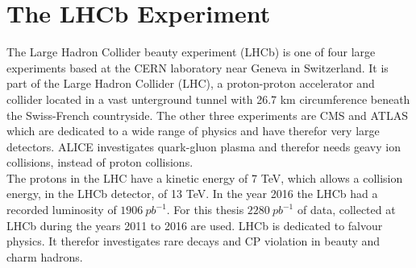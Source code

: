 \documentclass[english]{uzhpub}
\begin{document}


\section{The LHCb Experiment}
The Large Hadron Collider beauty experiment (LHCb) is one of four large experiments based at the CERN laboratory near Geneva in Switzerland. It is part of the Large Hadron Collider (LHC), a proton-proton accelerator and collider located in a vast unterground tunnel with 26.7 km circumference beneath the Swiss-French countryside.
The other three experiments are CMS and ATLAS which are dedicated to a wide range of physics and have therefor very large detectors. ALICE investigates quark-gluon plasma and therefor needs geavy ion collisions, instead of proton collisions. \\
The protons in the LHC have a kinetic energy of 7 TeV, which allows a collision energy, in the LHCb detector, of 13 TeV. In the year 2016 the LHCb had a recorded luminosity of $\SI{1906}{pb^{-1}}$. For this thesis $\SI{2280}{pb^{-1}}$ of data, collected at LHCb during the years 2011 to 2016 are used.
LHCb is dedicated to falvour physics. It therefor investigates rare decays and CP violation in beauty and charm hadrons.
\end{document}
